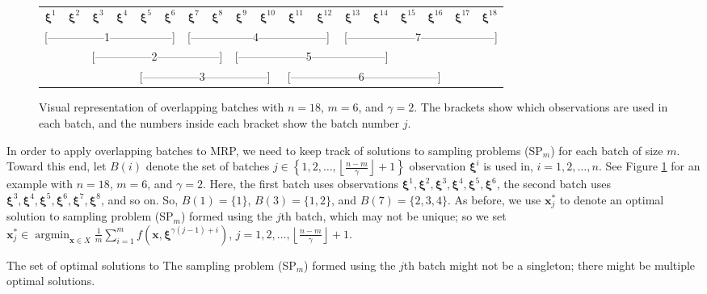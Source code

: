 \documentclass[12pt]{article}
\newcommand{\x}{\mathbf{x}}
\newcommand{\xs}{\x^*}
\newcommand{\xit}{\boldsymbol{\xi}}
\newcommand{\xiti}{\xit^i}
\newcommand{\nb}{\left\lfloor\tfrac{n-m}{\gamma}\right\rfloor+1}
\DeclareMathOperator*{\argmin}{argmin}
\begin{document}
\begin{figure}[tb!]
	\centering
	\begin{tabular}{*{18}{c}}
		$\xit^1$ & $\xit^2$ & $\xit^3$ & $\xit^4$ & $\xit^5$ & $\xit^6$ & $\xit^7$ & $\xit^8$ & $\xit^9$ & $\xit^{10}$ & $\xit^{11}$ & $\xit^{12}$ & $\xit^{13}$ & $\xit^{14}$ & $\xit^{15}$ & $\xit^{16}$ & $\xit^{17}$  & $\xit^{18}$ \\
		\multicolumn{6}{l}{[---------------1-----------------]} &
		\multicolumn{6}{l}{[-----------------4------------------]} &
		\multicolumn{6}{l}{[------------------7--------------------]} \\
		& & \multicolumn{6}{l}{[---------------2-----------------]} &
		\multicolumn{6}{l}{[------------------5--------------------]} \\
		& & & & \multicolumn{6}{l}{[---------------3-----------------]} &
		\multicolumn{6}{l}{[------------------6--------------------]} \\
	\end{tabular}
	\caption{Visual representation of overlapping batches with $n = 18$, $m = 6$, and $\gamma = 2$.  
        The brackets show which observations are used in each batch, and the numbers inside each bracket show the batch number $j$.}
	\label{fig:overlap_nonint}
\end{figure}

In order to apply overlapping batches to MRP, we need to keep track of solutions to sampling problems (SP$_m$) for each batch of size $m$.  
Toward this end, let $B(i)$ denote the set of batches $j \in \left\{1, 2, \dots, \nb \right\}$ observation $\xiti$ is used in, $i = 1, 2, \dots, n$.  
See Figure \ref{fig:overlap_nonint} for an example with $n=18$, $m = 6$, and $\gamma = 2$.  
Here, the first batch uses observations $\xit^1, \xit^2, \xit^3, \xit^4, \xit^5, \xit^6$, the second batch uses $\xit^3, \xit^4, \xit^5, \xit^6, \xit^7, \xit^8$, and so on.  
So, $B(1) = \{1\}$, $B(3) = \{1,2\}$, and $B(7)=\{2,3,4\}$.  
As before, we use $\xs_j$ to denote an optimal solution to sampling problem (SP$_m$) formed using the $j$th batch, which may not be unique; so we set $\xs_j \in \argmin_{\x \in X} \frac{1}{m} \sum_{i=1}^m f(\x,\xit^{\gamma(j-1) + i})$, $j = 1, 2, \dots, \nb$. 

The set of optimal solutions to The sampling problem (SP$_m$) formed using the $j$th batch might not be a singleton; there might be multiple optimal solutions. 
\end{document}
